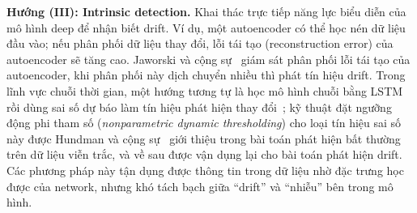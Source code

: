 \textbf{Hướng (III): Intrinsic detection.} Khai thác trực tiếp năng lực biểu diễn của mô hình deep để nhận biết drift. Ví dụ, một autoencoder có thể học nén dữ liệu đầu vào; nếu phân phối dữ liệu thay đổi, lỗi tái tạo (reconstruction error) của autoencoder sẽ tăng cao. Jaworski và cộng sự~\cite{jaworski2020aedetect} giám sát phân phối lỗi tái tạo của autoencoder, khi phân phối này dịch chuyển nhiều thì phát tín hiệu drift. Trong lĩnh vực chuỗi thời gian, một hướng tương tự là học mô hình chuỗi bằng LSTM rồi dùng sai số dự báo làm tín hiệu phát hiện thay đổi~\cite{yuan2022advances}; kỹ thuật đặt ngưỡng động phi tham số (\textit{nonparametric dynamic thresholding}) cho loại tín hiệu sai số này được Hundman và cộng sự~\cite{hundman2018lstmndt} giới thiệu trong bài toán phát hiện bất thường trên dữ liệu viễn trắc, và về sau được vận dụng lại cho bài toán phát hiện drift. Các phương pháp này tận dụng được thông tin trong dữ liệu nhờ đặc trưng học được của network, nhưng khó tách bạch giữa ``drift'' và ``nhiễu'' bên trong mô hình.


